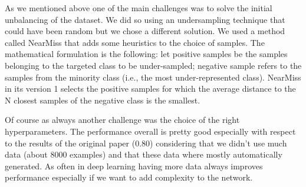 \documentclass[a4paper, 9pt]{article}
\begin{document}
As we mentioned above one of the main challenges was to solve the initial unbalancing of the dataset. We did
so using an undersampling technique that could have been random but we chose a different solution. We used 
a method called NearMiss that adds some heuristics to the choice of samples. The mathematical formulation is
the following: let positive samples be the samples belonging to the targeted class to be under-sampled;
negative sample refers to the samples from the minority class (i.e., the most under-represented class).
NearMiss in its version 1 selects the positive samples for which the average distance to the N closest
samples of the negative class is the smallest.

Of course as always another challenge was the choice of the right hyperparameters. The performance overall
is pretty good especially with respect to the results of the original paper (0.80) considering that we
didn't use much data (about 8000 examples) and that these data where mostly automatically generated.
As often in deep learning having more data always improves performance especially if we want to add 
complexity to the network.
\end{document}
